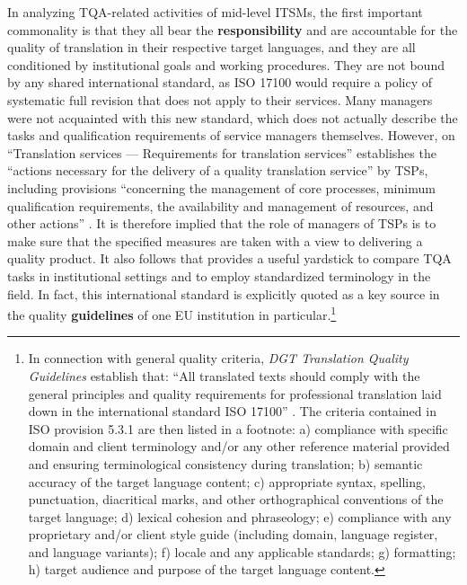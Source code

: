 \documentclass[output=paper]{langsci/langscibook}
\begin{document}
In analyzing TQA-related activities of mid-level ITSMs, the first important commonality is that they all bear the \textbf{responsibility} and are accountable for the quality of translation in their respective target languages, and they are all conditioned by institutional goals and working procedures. They are not bound by any shared international standard, as ISO 17100 would require a policy of systematic full revision that does not apply to their services. Many managers were not acquainted with this new standard, which does not actually describe the tasks and qualification requirements of service managers themselves. However, \citeauthor{ISO2015} on “Translation services — Requirements for translation services” establishes the “actions necessary for the delivery of a quality translation service” by TSPs, including provisions “concerning the management of core processes, minimum qualification requirements, the availability and management of resources, and other actions” \citep[vi]{ISO2015}. It is therefore implied that the role of managers of TSPs is to make sure that the specified measures are taken with a view to delivering a quality product. It also follows that \citeauthor{ISO2015} provides a useful yardstick to compare TQA tasks in institutional settings and to employ standardized terminology in the field. In fact, this international standard is explicitly quoted as a key source in the quality \textbf{guidelines} of one EU institution in particular.\footnote{In connection with general quality criteria, \textit{DGT Translation Quality Guidelines} establish that: “All translated texts should comply with the general principles and quality requirements for professional translation laid down in the international standard ISO 17100” \citep[3]{DGT2015a}. The criteria contained in ISO provision 5.3.1 \citep[10]{ISO2015} are then listed in a footnote: a) compliance with specific domain and client terminology and/or any other reference material provided and ensuring terminological consistency during translation; b) semantic accuracy of the target language content; c) appropriate syntax, spelling, punctuation, diacritical marks, and other orthographical conventions of the target language; d) lexical cohesion and phraseology; e) compliance with any proprietary and/or client style guide (including domain, language register, and language variants); f) locale and any applicable standards; g) formatting; h) target audience and purpose of the target language content.} 
\end{document}
